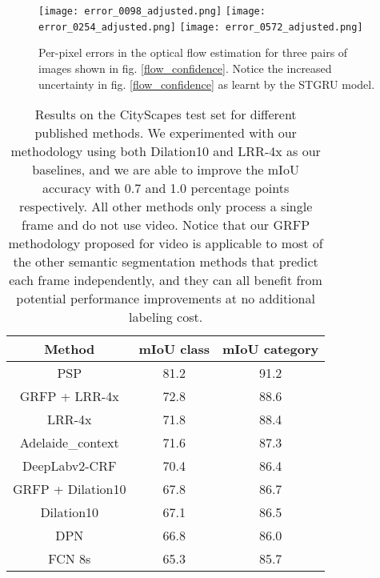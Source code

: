 \documentclass[10pt,twocolumn,letterpaper]{article}
\begin{document}
\begin{figure}
\texttt{[image: error\_0098\_adjusted.png]}
\texttt{[image: error\_0254\_adjusted.png]}
\texttt{[image: error\_0572\_adjusted.png]}
\caption{Per-pixel errors in the optical flow estimation for three pairs of images shown in fig. \ref{flow_confidence}. Notice the increased uncertainty in fig. \ref{flow_confidence} as learnt by the STGRU model. }
\label{fig:flow-unc}
\end{figure}

\begin{table}[!htbp]
    \centering
    \begin{tabular}{|c||c|c|}
    \hline
        Method & mIoU class & mIoU category \\ \hline\hline
        PSP \cite{Zhao_2017_CVPR} & 81.2 & 91.2 \\ \hline
        GRFP + LRR-4x & 72.8 & 88.6 \\ \hline
        LRR-4x \cite{lrr4x} & 71.8 & 88.4 \\ 
        Adelaide\_context \cite{lin2015efficient} & 71.6 & 87.3 \\ 
        DeepLabv2-CRF \cite{chen2014semantic} & 70.4 & 86.4 \\
\hline
        GRFP + Dilation10 & 67.8 & 86.7 \\
        \hline
        Dilation10 \cite{yu2015multi} & 67.1 & 86.5 \\
        DPN \cite{liu2015semantic} & 66.8 & 86.0 \\
        FCN 8s \cite{long2015fully} & 65.3 & 85.7 \\ \hline
    \end{tabular}
\caption{Results on the CityScapes test set for different published methods. We experimented with our methodology using both Dilation10 and LRR-4x as our baselines, and we are able to improve the mIoU accuracy with 0.7 and 1.0 percentage points respectively. All other methods only process a single frame and do not use video. Notice that our GRFP methodology proposed for video is applicable to most of the other semantic segmentation methods that predict each frame independently, and they can all benefit from potential performance improvements at no additional labeling cost.}
    \label{tab:test_set_results}
\end{table}
\end{document}
